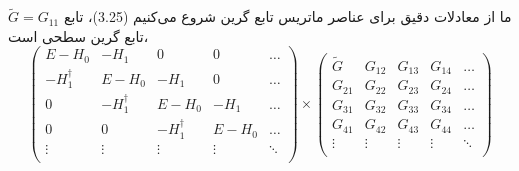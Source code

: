 ما از معادلات دقیق برای عناصر ماتریس تابع گرین شروع می‌کنیم (3.25)، تابع $\tilde{G}={{G}_{11}}$ تابع گرین سطحی است،
\begin{equation}
    \left( \begin{matrix}
           E-{{H}_{0}} & -{{H}_{1}} & 0 & 0 & \ldots   \\
           -H_{1}^{\dagger } & E-{{H}_{0}} & -{{H}_{1}} & 0 & \ldots   \\
           0 & -H_{1}^{\dagger } & E-{{H}_{0}} & -{{H}_{1}} & \ldots   \\
           0 & 0 & -H_{1}^{\dagger } & E-{{H}_{0}} & \ldots   \\
           \vdots  & \vdots  & \vdots  & \vdots  & \ddots   \\
        \end{matrix} \right)\times \left( \begin{matrix}
           {\tilde{G}} & {{G}_{12}} & {{G}_{13}} & {{G}_{14}} & \ldots   \\
           {{G}_{21}} & {{G}_{22}} & {{G}_{23}} & {{G}_{24}} & \ldots   \\
           {{G}_{31}} & {{G}_{32}} & {{G}_{33}} & {{G}_{34}} & \ldots   \\
           {{G}_{41}} & {{G}_{42}} & {{G}_{43}} & {{G}_{44}} & \ldots   \\
           \vdots  & \vdots  & \vdots  & \vdots  & \ddots   \\
        \end{matrix} \right)
\end{equation}

